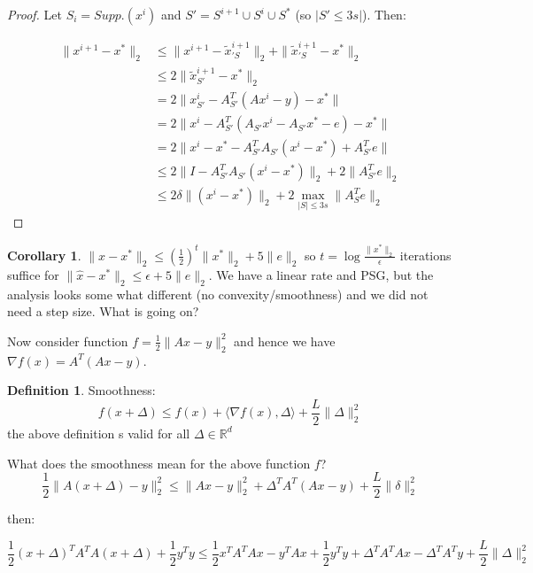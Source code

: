 \documentclass{article}
\theoremstyle{definition}
\newtheorem{definition}{Definition}
\newtheorem{corollary}{Corollary}
\begin{document}
\begin{proof}
Let $S_i = Supp. (x^i)$ and $ S\prime = S^{i+1} \cup S^i \cup S^*$ (so $|S \prime \leq 3s|$). Then:

\begin{align*}
\|x^{i+1}-x^*\|_2 &\leq \|x^{i+1} - \tilde x_{\prime S}^{i+1}\|_2 + \|\tilde x_{\prime S}^{i+1} -x^*\|_2\  \tag{ by "triangle inequality"}\\
			 &\leq 2 \|\tilde x_{ S\prime}^{i+1} -x^*\|_2\\ 
			 &= 2 \|x_{ S\prime}^i - A_ { S\prime}^T(Ax^i -y)-x^*\|\\
			 &= 2 \|x^i - A_ {S\prime}^T(A_ { S \prime}x^i -A_ { S\prime}x^*-e)-x^*\|\\
			 &= 2 \|x^i - x^*- A_ { S\prime}^TA_ { S\prime} (x^i-x^*) + A_ {S \prime}^Te\|\\
			 &\leq 2\| I -  A_ {S \prime}^TA_ {S \prime} (x^i-x^*)\|_2 +   2\| A_ {S \prime}^Te\|_2 \\
			 &\leq 2 \delta \| (x^i-x^*)\|_2 +   2 \max_{|S| \leq 3s}\| A_ {S}^Te\|_2
\end{align*}
\end{proof}

\begin{corollary}
$\| \hat x - x^*\|_2 \leq (\frac{1}{2})^t \|x^* \|_2 + 5\|e\|_2$
so $t = \log \frac{\| x^*\|_2}{\epsilon}$ iterations suffice for $\| \hat x - x^*\|_2 \leq \epsilon + 5\|e\|_2$.
 We have a linear rate and PSG, but the analysis looks some what different (no convexity/smoothness) and we did not need a step size. What is going on?
\end{corollary}
Now consider function $f =  \frac{1}{2}\|Ax-y \|_2^2$ and hence we have $\nabla f(x) = A^T(Ax-y)$.

\begin{definition}
Smoothness:
$$f(x+\Delta) \leq f(x) + \langle \nabla f(x), \Delta \rangle + \frac{L}{2} \| \Delta\|_2^2 $$
the above definition s valid for all $\Delta \in \mathbb{R}^d$  
\end{definition}

What does the smoothness mean for the above function $f$?
$$\frac{1}{2}\|A(x+\Delta) - y\|_2^2 \leq \|Ax-y\|_2^2 + \Delta ^T A^T(Ax-y) + \frac{L}{2}\|\delta\|_2^2$$

then:

$$\frac{1}{2}(x+\Delta)^TA^TA(x+\Delta) + \frac{1}{2}y^Ty \leq \frac{1}{2} x^TA^TAx-y^TAx + \frac{1}{2}y^Ty + \Delta ^T A^TAx- \Delta^TA^Ty + \frac{L}{2} \|\Delta\|_2^2 $$
\end{document}
